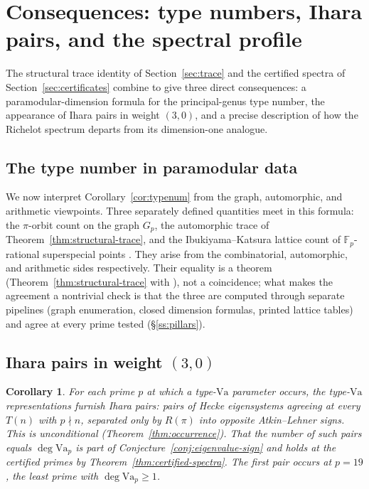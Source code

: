 \documentclass[11pt]{amsart}
\theoremstyle{plain}
\newtheorem{corollary}[theorem]{Corollary}
\theoremstyle{definition}
\newcommand{\F}{\mathbb{F}}
\newcommand{\Va}{\mathrm{Va}}
\providecommand{\Va}{\mathrm{Va}}
\begin{document}
	\section{Consequences: type numbers, Ihara pairs, and the spectral profile}
	\label{sec:consequences}
	
	The structural trace identity of Section~\ref{sec:trace} and the certified
	spectra of Section~\ref{sec:certificates} combine to give three direct
	consequences: a paramodular-dimension formula for the principal-genus type
	number, the appearance of Ihara pairs in weight $(3,0)$, and a precise
	description of how the Richelot spectrum departs from its dimension-one
	analogue.
	
	\subsection{The type number in paramodular data}
	\label{ss:typenum-consequence}
	
	We now interpret Corollary~\ref{cor:typenum} from the graph,
	automorphic, and arithmetic viewpoints. Three separately defined quantities meet in this formula: the $\pi$-orbit count on the graph $G_p$, the automorphic trace of
	Theorem~\ref{thm:structural-trace}, and the Ibukiyama--Katsura lattice count of
	$\F_p$-rational superspecial points \cite[Thm.~2, Rem.~3]{IbukiyamaKatsura}. They arise from the combinatorial, automorphic, and arithmetic sides respectively. Their equality is a
	theorem (Theorem~\ref{thm:structural-trace} with \cite[Thm.~2]{IbukiyamaKatsura}), not a coincidence; what makes the agreement a nontrivial check is that the three are computed through separate pipelines (graph enumeration, closed dimension formulas, printed
	lattice tables) and agree at every prime tested (\S\ref{ss:pillars}).
	
	\subsection{Ihara pairs in weight $(3,0)$}
	\label{ss:ihara-consequence}
	
	\begin{corollary}	For each prime $p$ at which a type-$\Va$ parameter occurs, the
		type-$\Va$ representations furnish Ihara pairs: pairs of Hecke
		eigensystems agreeing at every $T(n)$ with $p\nmid n$, separated only
		by $R(\pi)$ into opposite Atkin--Lehner signs. This is unconditional
		(Theorem~\ref{thm:occurrence}). That the number of such pairs equals
		$\deg\Va_p$ is part of Conjecture~\ref{conj:eigenvalue-sign} and
		holds at the certified primes by Theorem~\ref{thm:certified-spectra}.
		The first pair occurs at $p=19$, the least prime with
		$\deg\Va_p\ge1$.
	\end{corollary}
	
\end{document}
